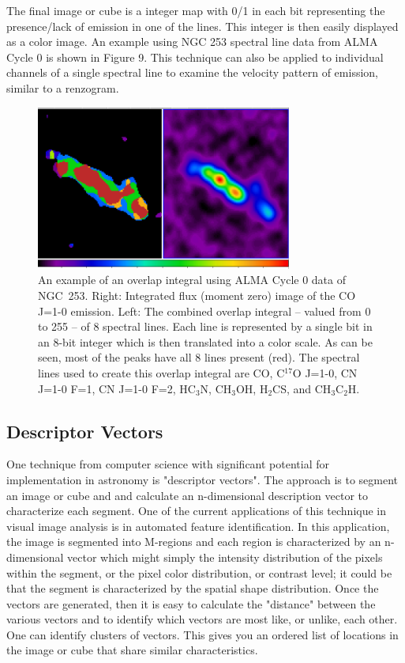 The final image or cube is a integer map with 0/1 in each bit representing the presence/lack
of emission in one of the lines. This integer is then easily displayed as a color image.
An example using NGC 253 spectral line data from ALMA Cycle 0 is
shown in Figure 9. This technique can also be applied to individual channels of
a single spectral line to examine the velocity pattern of emission, similar to a renzogram.

\begin{figure}[t]
\centering
\includegraphics[width=0.75\textwidth]{overlap.png}
\hspace{0.03in}
\caption{\small \setlength{\baselineskip}{0.85\baselineskip}
An example of an overlap integral using ALMA Cycle 0 data of NGC~253. Right: Integrated flux
(moment zero) image of the CO J=1-0 emission. Left: The combined overlap integral -- valued from
0 to 255 -- of 8 spectral lines. Each line is represented by a single bit in an 8-bit
integer which is then translated into a color scale. As can be seen, most of the peaks
have all 8 lines present (red). The spectral lines used to create this overlap integral are
CO, C$^{17}$O J=1-0, CN J=1-0 F=1, CN J=1-0 F=2, HC$_{3}$N, CH$_{3}$OH, H$_2$CS,
and CH$_{3}$C$_{2}$H.
  }
\label{fig:hst}
\end{figure}

\subsection{Descriptor Vectors}

One technique from computer science with significant potential for implementation
in astronomy is "descriptor vectors". The approach is to segment an image or
cube and and calculate an n-dimensional description vector to characterize each
segment. One of the current applications of this technique in visual image analysis
is in automated feature identification. In this application, the image is segmented
into M-regions and each region is characterized by an n-dimensional vector which
might simply the intensity distribution of the pixels within the segment, or the
pixel color distribution, or contrast level; it could be that the segment is characterized
by the spatial shape distribution. Once the vectors are generated, then it is
easy to calculate the "distance" between the various vectors and to identify
which vectors are most like, or unlike, each other. One can identify clusters
of vectors. This gives you an ordered list of locations in the image or cube
that share similar characteristics.

